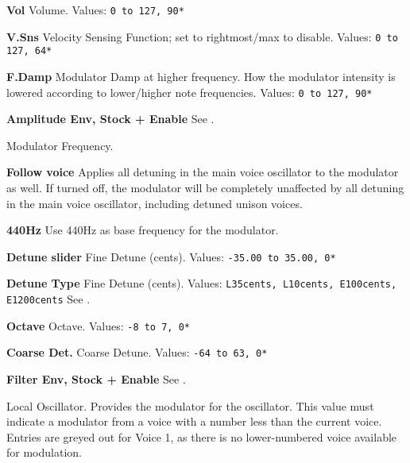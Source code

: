    \begin{enumber}
      \item \textbf{Vol}
         Volume.
         Values: \texttt{0 to 127, 90*}
      \item \textbf{V.Sns}
         Velocity Sensing Function; set to rightmost/max to disable.
         Values: \texttt{0 to 127, 64*}
      \item \textbf{F.Damp}
         Modulator Damp at higher frequency.
         How the modulator intensity is lowered according to lower/higher
         note frequencies.
         Values: \texttt{0 to 127, 90*}
      \item \textbf{Amplitude Env, Stock + Enable}
         See .
   \end{enumber}

   Modulator Frequency.


   \begin{enumber}
     \item \textbf{Follow voice}
        Applies all detuning in the main voice oscillator to the modulator as
        well. If turned off, the modulator will be completely unaffected by all
        detuning in the main voice oscillator, including detuned unison voices.
     \item \textbf{440Hz}
        Use 440Hz as base frequency for the modulator.
      \item \textbf{Detune slider}
         Fine Detune (cents).
         Values: \texttt{-35.00 to 35.00, 0*}
      \item \textbf{Detune Type}
         Fine Detune (cents).
         Values: \texttt{L35cents, L10cents, E100cents, E1200cents}
         See .
      \item \textbf{Octave}
         Octave.
         Values: \texttt{-8 to 7, 0*}
      \item \textbf{Coarse Det.}
         Coarse Detune.
         Values: \texttt{-64 to 63, 0*}
      \item \textbf{Filter Env, Stock + Enable}
         See .
   \end{enumber}

   Local Oscillator.
   Provides the modulator for the oscillator.
   This value must indicate a modulator from a voice with a number less than
   the current voice. Entries are greyed out for Voice 1, as there is no
   lower-numbered voice available for modulation.

